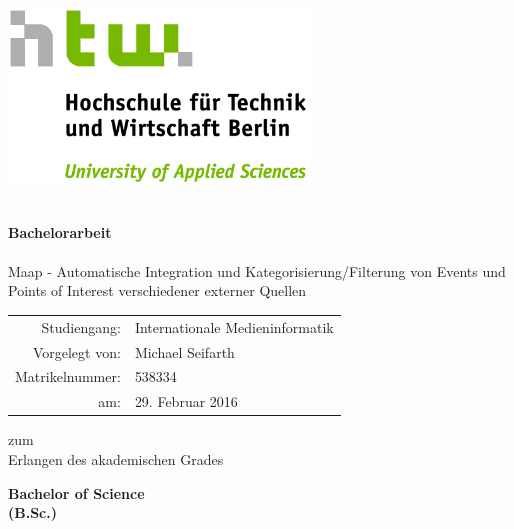 \titlepage

\begin{center}
\includegraphics[width=8cm]{images/HTW_Logo_rgb.jpg}\vspace{0.5cm}
\par\end{center}

\noindent \begin{center}
\textsf{}\\
\textsf{\textbf{\huge Bachelorarbeit}}\\
\textsf{}\\
\textsf{\large Maap - Automatische Integration und Kategorisierung/Filterung von Events und Points of Interest verschiedener externer Quellen}
\par\end{center}{\Large \par}

\vspace{2cm}


\noindent \begin{center}
{\huge }\begin{tabular}{rl}
Studiengang: & Internationale Medieninformatik\tabularnewline
Vorgelegt von: & Michael Seifarth\tabularnewline
Matrikelnummer: & 538334\tabularnewline
am: & 29. Februar 2016\tabularnewline
\end{tabular}
\par\end{center}{\huge \par}

\vspace{1cm}


\noindent \begin{center}
zum \\
Erlangen des akademischen Grades\textsf{}\\
\textsf{\smallskip{}
}
\par\end{center}

\noindent \begin{center}
\textsf{\textbf{\huge Bachelor of Science}}\textsf{\textbf{\LARGE }}\\
\textsf{\textbf{(B.Sc.)}}
\par\end{center}


